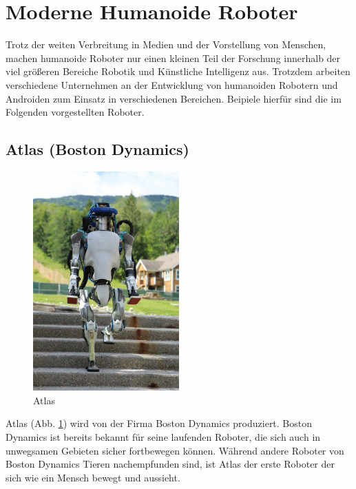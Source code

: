 \section{Moderne Humanoide Roboter}\label{sec:moderne-humanoide-roboter}
Trotz der weiten Verbreitung in Medien und der Vorstellung von
Menschen, machen humanoide Roboter nur einen kleinen Teil der Forschung
innerhalb der viel größeren Bereiche Robotik und Künstliche Intelligenz aus.
\cite{Dautenhahn2011} Trotzdem arbeiten verschiedene Unternehmen an der
Entwicklung von humanoiden Robotern und Androiden zum Einsatz in verschiedenen
Bereichen. Beipiele hierfür sind die im Folgenden vorgestellten Roboter.

\subsection{Atlas (Boston Dynamics)}
\begin{figure}
  \centering
     \includegraphics[width=0.5\textwidth]{atlas}
  \caption{Atlas \cite{AbbildungAtlas}}
  \label{fig:atlas}
\end{figure}
Atlas (Abb. \ref{fig:atlas}) wird von der Firma Boston Dynamics produziert.
Boston Dynamics ist bereits bekannt für seine laufenden Roboter, die sich auch
in unwegsamen Gebieten sicher fortbewegen können. Während andere Roboter von
Boston Dynamics Tieren nachempfunden sind, ist Atlas der erste Roboter der sich
wie ein Mensch bewegt und aussieht.

